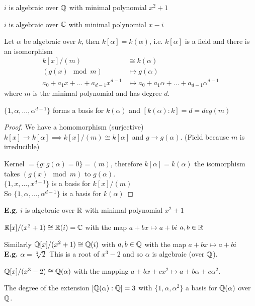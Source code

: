 \documentclass[11pt]{article}
\begin{document}
$i$ is algebraic over $\mathbb{Q}$ with minimal polynomial $x^2 + 1$

$i $ is algebraic over $\mathbb{C}$ with minimal polynomial $x-i$


\begin{cor}
	Let $\alpha$ be algebraic over $k$, then $k[\alpha] = k(\alpha)$, i.e. $k[\alpha]$ is a field and there is an isomorphism 
	\begin{align*}
		k[x]/ (m) &\cong k(\alpha)\\
		(g(x) \mod m) &\mapsto g(\alpha)\\
		a_0+a_1x +\dots + a_{d-1}x^{d-1} &\mapsto a_0 + a_1\alpha + \dots +a_{d-1}\alpha^{d-1} 
	\end{align*}
	where $m$ is the minimal polynomial and has degree $d$.
\end{cor}

$\{ 1, \alpha, \dots, \alpha^{d-1} \}$ forms a basis for $k(\alpha)$ and $[k(\alpha) : k] = d = deg(m)$




\begin{proof}
	We have a homomorphism (surjective) $k[x] \to k[\alpha] \implies k[x] / (m) \cong k[\alpha]$ and $g \to g(\alpha) $.
	(Field because $m$ is irreducible)

	Kernel $= \{ g: g(\alpha) = 0 \} = (m)$, therefore $k[\alpha]= k(\alpha) $ the isomorphism takes $(g(x) \mod m)$ to $g(\alpha)$.
	$ $\\[1em]
	 $ \{ 1,x,\dots, x^{d-1} \}$ is a basis for $k[x]/(m) $
	 $ $\\[1em]
	 So $ \{ 1,\alpha, \dots, \alpha^{d-1} \}$ is a basis for $k(\alpha)$
\end{proof}
$ $\\[-0.5em]
\textbf{E.g.} $i$ is algebraic over $\mathbb{R}$ with minimal polynomial $x^2 + 1$


$ \mathbb{R}[x] /(x^2 + 1) \cong \mathbb{R}(i) = \mathbb{C}$ with the map $a+bx \mapsto a+bi $ $a,b \in \mathbb{R}$

$ $\\[1em]
Similarly $\mathbb{Q}[x] /(x^2 + 1) \cong \mathbb{Q}(i) $ with $a,b \in \mathbb{Q}$ with the map $ a+bx \mapsto a+bi$
$ $\\[1em]
\textbf{E.g.} $\alpha = \sqrt[3]{2}$ This is a root of $x^3 - 2$ and so $\alpha$ is algebraic (over $\mathbb{Q}$).

$\mathbb{Q}[x] / (x^3 -2 ) \cong \mathbb{Q}(\alpha) $ with the mapping $a+bx+cx^2 \mapsto a+b\alpha + c\alpha^2$.

The degree of the extension $[\mathbb{Q}(\alpha) : \mathbb{Q}] = 3$ with $\{1,\alpha, \alpha^2 \}$ a basis for $\mathbb{Q}(\alpha)$ over $\mathbb{Q}$.
\end{document}
